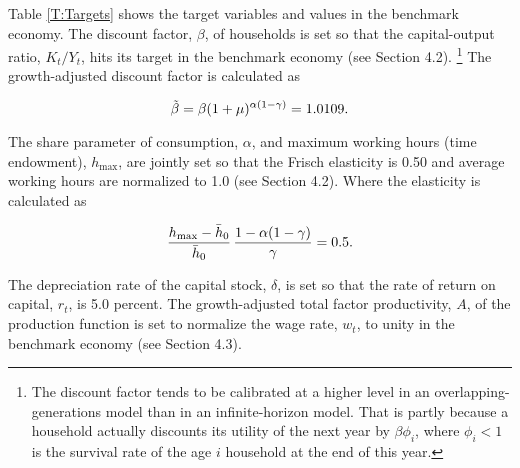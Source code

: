 \documentclass[11pt,leqno,fleqn]{article}
\newcommand{\be}{\vspace{-1em}\begin{singlespace}\begin{equation}}
\newcommand{\ee}{\end{equation}\end{singlespace}}
\begin{document}
Table \ref{T:Targets} shows the target variables and values in the benchmark economy. The discount factor, $\beta$, of households is set so that the capital-output ratio, $K_{t}/Y_{t}$, hits its target in the benchmark economy (see Section 4.2). \footnote{The discount factor tends to be calibrated at a higher level in an overlapping-generations model than in an infinite-horizon model. That is partly because a household actually discounts its utility of the next year by $\beta\phi_{i}$, where $\phi_{i}<1$ is the survival rate of the age $i$ household at the end of this year.} The growth-adjusted discount factor is calculated as

\be \tilde{\beta}=\beta(1+\mu)^{\alpha(1-\gamma)}=1.0109. \notag \ee

The share parameter of consumption, $\alpha$, and maximum working hours (time endowment), $h_{\max}$, are jointly set so that the Frisch elasticity is 0.50 and average working hours are normalized to 1.0 (see Section 4.2). Where the elasticity is calculated as
\be \frac{h_{\max}-\bar{h}_{0}}{\bar{h}_{0}}\,\frac{1-\alpha(1-\gamma)}{\gamma}=0.5. \notag \ee

The depreciation rate of the capital stock, $\delta$, is set so that the rate of return on capital, $r_{t}$, is 5.0 percent. The growth-adjusted total factor productivity, $A$, of the production function is set to normalize the wage rate, $w_{t}$, to unity in the benchmark economy (see Section 4.3).
\end{document}
